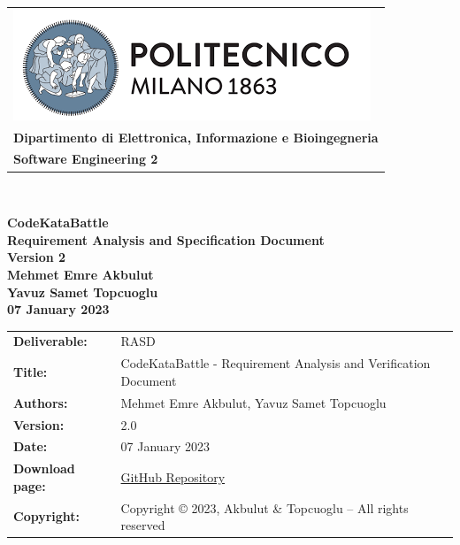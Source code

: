 \documentclass [11pt,twoside]{article}
\begin{document}

\begin{titlepage}



\begin{table}[t!]
\centering
\begin{tabu} to \textwidth { X[c] }
\includegraphics[scale=0.5]{Images/PolimiLogo} \\
\textbf{\small{Dipartimento di Elettronica, Informazione e Bioingegneria}} \\ 
\textbf{\small{Software Engineering 2}} \\
\end{tabu}
\end{table} ~
\\ [4cm]


\begin{center}
{\textbf{\Huge{CodeKataBattle}}} \\ 
\vspace{2mm}
{\textbf{\small{Requirement Analysis and Specification Document}}} \\ 
{\textbf{\footnotesize{Version 2}}} \\ [4cm]
\textbf{\small{Mehmet Emre Akbulut}} \\
\vspace{1mm}
\textbf{\small{Yavuz Samet Topcuoglu}} \\ [1cm]
\textbf{\footnotesize{07 January 2023}}
\end{center}





\end{titlepage}

\begin{table}[h!]
\begin{tabu} to \textwidth { X[0.3,r,p] X[0.7,l,p] }
\hline

\textbf{Deliverable:} & RASD\\
\textbf{Title:} & CodeKataBattle - Requirement Analysis and Verification Document \\
\textbf{Authors:} & Mehmet Emre Akbulut, Yavuz Samet Topcuoglu \\
\textbf{Version:} & 2.0 \\ 
\textbf{Date:} & 07 January 2023 \\
\textbf{Download page:} & \href{https://github.com/mehmetemreakbulut/AkbulutTopcuoglu}{GitHub Repository} \\
\textbf{Copyright:} & Copyright © 2023, Akbulut \& Topcuoglu – All rights reserved \\
\hline
\end{tabu}
\end{table}
\end{document}
